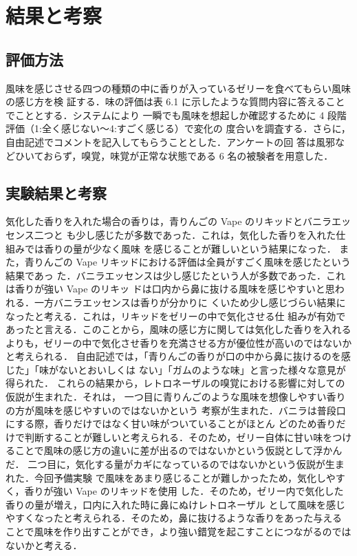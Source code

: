 \section{結果と考察}

\subsection{評価方法}

風味を感じさせる四つの種類の中に香りが入っているゼリーを食べてもらい風味の感じ方を検
証する．味の評価は表 6.1 に示したような質問内容に答えることでこととする．システムにより
一瞬でも風味を想起しか確認するために 4 段階評価（1:全く感じない～4:すごく感じる）で変化の
度合いを調査する．さらに，自由記述でコメントを記入してもらうこととした．アンケートの回
答は風邪などひいておらず，嗅覚，味覚が正常な状態である 6 名の被験者を用意した．


\subsection{実験結果と考察}

気化した香りを入れた場合の香りは，青りんごの Vape のリキッドとバニラエッセンス二つと
も少し感じたが多数であった．これは，気化した香りを入れた仕組みでは香りの量が少なく風味
を感じることが難しいという結果になった．
また，青りんごの Vape リキッドにおける評価は全員がすごく風味を感じたという結果であっ
た．バニラエッセンスは少し感じたという人が多数であった．これは香りが強い Vape のリキッ
ドは口内から鼻に抜ける風味を感じやすいと思われる．一方バニラエッセンスは香りが分かりに
くいため少し感じづらい結果になったと考える．これは，リキッドをゼリーの中で気化させる仕
組みが有効であったと言える．このことから，風味の感じ方に関しては気化した香りを入れるよりも，ゼリーの中で気化させ香りを充満させる方が優位性が高いのではないかと考えられる．
自由記述では，「青りんごの香りが口の中から鼻に抜けるのを感じた」「味がないとおいしくは
ない」「ガムのような味」と言った様々な意見が得られた．
これらの結果から，レトロネーザルの嗅覚における影響に対しての仮説が生まれた．それは，
一つ目に青りんごのような風味を想像しやすい香りの方が風味を感じやすいのではないかという
考察が生まれた．バニラは普段口にする際，香りだけではなく甘い味がついていることがほとん
どのため香りだけで判断することが難しいと考えられる．そのため，ゼリー自体に甘い味をつけ
ることで風味の感じ方の違いに差が出るのではないかという仮説として浮かんだ．
二つ目に，気化する量がカギになっているのではないかという仮説が生まれた．今回予備実験
で風味をあまり感じることが難しかったため，気化しやすく，香りが強い Vape のリキッドを使用
した．そのため，ゼリー内で気化した香りの量が増え，口内に入れた時に鼻にぬけレトロネーザル
として風味を感じやすくなったと考えられる．そのため，鼻に抜けるような香りをあった与える
ことで風味を作り出すことができ，より強い錯覚を起こすことにつながるのではないかと考える．